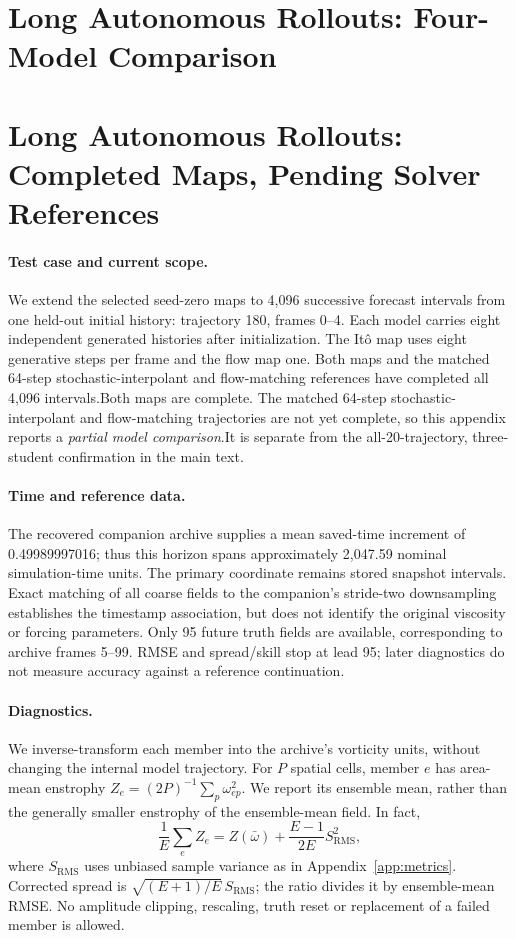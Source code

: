 \iflongAllModels
\section{Long Autonomous Rollouts: Four-Model Comparison}
\else
\section{Long Autonomous Rollouts: Completed Maps, Pending Solver References}
\fi
\label{app:long-horizon}

\paragraph{Test case and current scope.}
We extend the selected seed-zero maps to 4,096 successive forecast intervals from one held-out initial history: trajectory 180, frames 0--4. Each model carries eight independent generated histories after initialization. The It\^o map uses eight generative steps per frame and the flow map one. \iflongAllModels Both maps and the matched 64-step stochastic-interpolant and flow-matching references have completed all 4,096 intervals.\else Both maps are complete. The matched 64-step stochastic-interpolant and flow-matching trajectories are not yet complete, so this appendix reports a \emph{partial model comparison}.\fi It is separate from the all-20-trajectory, three-student confirmation in the main text.

\paragraph{Time and reference data.}
The recovered companion archive supplies a mean saved-time increment of 0.49989997016; thus this horizon spans approximately 2,047.59 nominal simulation-time units. The primary coordinate remains stored snapshot intervals. Exact matching of all coarse fields to the companion's stride-two downsampling establishes the timestamp association, but does not identify the original viscosity or forcing parameters. Only 95 future truth fields are available, corresponding to archive frames 5--99. RMSE and spread/skill stop at lead 95; later diagnostics do not measure accuracy against a reference continuation.

\paragraph{Diagnostics.}
We inverse-transform each member into the archive's vorticity units, without changing the internal model trajectory. For $P$ spatial cells, member $e$ has area-mean enstrophy $Z_e=(2P)^{-1}\sum_p\omega_{ep}^2$. We report its ensemble mean, rather than the generally smaller enstrophy of the ensemble-mean field. In fact,
\begin{equation}
\frac1E\sum_e Z_e
= Z(\bar\omega)+\frac{E-1}{2E}S_{\mathrm{RMS}}^2,
\end{equation}
where $S_{\mathrm{RMS}}$ uses unbiased sample variance as in Appendix~\ref{app:metrics}. Corrected spread is $\sqrt{(E+1)/E}\,S_{\mathrm{RMS}}$; the ratio divides it by ensemble-mean RMSE. No amplitude clipping, rescaling, truth reset or replacement of a failed member is allowed. \longAuditSentence

